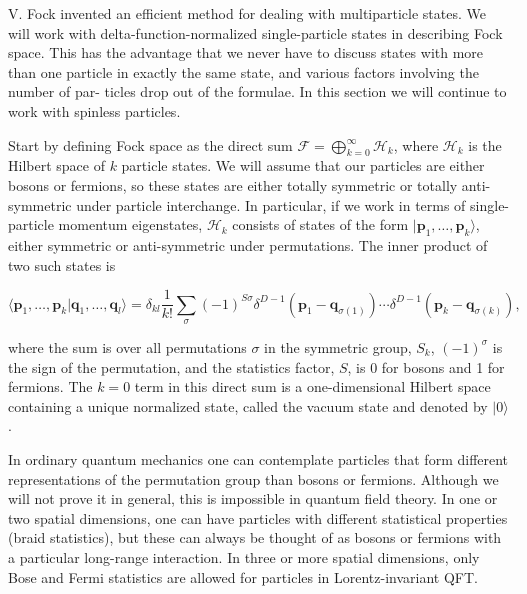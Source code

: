 V. Fock invented an efficient method for dealing with multiparticle states. We will
work with delta-function-normalized single-particle states in describing Fock space.
This has the advantage that we never have to discuss states with more than one
particle in exactly the same state, and various factors involving the number of par-
ticles drop out of the formulae. In this section we will continue to work with spinless
particles.

Start by defining Fock space as the direct sum $\mathcal F=\bigoplus_{k=0}^{\infty}\mathcal H_k$, where $\mathcal H_k$ is the Hilbert
space of $k$ particle states. We will assume that our particles are either bosons or fermions,
so these states are either totally symmetric or totally anti-symmetric under particle
interchange. In particular, if we work in terms of single-particle momentum eigenstates,
$\mathcal H_k$ consists of states of the form $|\mathbf p_1,\ldots,\mathbf p_k\rangle$, either symmetric or anti-symmetric under
permutations. The inner product of two such states is

\begin{equation}
\langle \mathbf p_1,\ldots,\mathbf p_k|\mathbf q_1,\ldots,\mathbf q_l\rangle
=\delta_{kl}\frac{1}{k!}\sum_{\sigma}(-1)^{S\sigma}
\delta^{D-1}(\mathbf p_1-\mathbf q_{\sigma(1)})\cdots\delta^{D-1}(\mathbf p_k-\mathbf q_{\sigma(k)}),
\label{eq:2.1}
\end{equation}

where the sum is over all permutations $\sigma$ in the symmetric group, $S_k$, $(-1)^\sigma$ is the sign
of the permutation, and the statistics factor, $S$, is 0 for bosons and 1 for fermions.
The $k=0$ term in this direct sum is a one-dimensional Hilbert space containing a
unique normalized state, called the vacuum state and denoted by $|0\rangle$.

In ordinary quantum mechanics one can contemplate particles that form different
representations of the permutation group than bosons or fermions. Although we will
not prove it in general, this is impossible in quantum field theory. In one or two spatial
dimensions, one can have particles with different statistical properties (braid statistics),
but these can always be thought of as bosons or fermions with a particular long-range
interaction. In three or more spatial dimensions, only Bose and Fermi statistics are
allowed for particles in Lorentz-invariant QFT.

